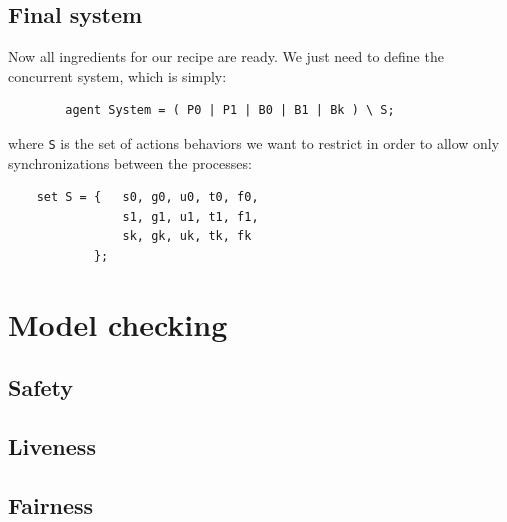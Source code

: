 \documentclass[10pt,a4paper]{article}
\newcommand{\CCSCode}[1]{{\tt #1}}
\begin{document}
    \subsection{Final system}

        Now all ingredients for our recipe are ready. We just need to
        define the concurrent system, which is simply:
        \begin{verbatim}
        agent System = ( P0 | P1 | B0 | B1 | Bk ) \ S;
        \end{verbatim}
        where \CCSCode{S} is the set of actions behaviors we want to
        restrict in order to allow only synchronizations between the
        processes:
        \begin{verbatim}
    set S = {   s0, g0, u0, t0, f0,
                s1, g1, u1, t1, f1,
                sk, gk, uk, tk, fk
            };
        \end{verbatim}

\section{Model checking}

    \subsection{Safety}

    \subsection{Liveness}

    \subsection{Fairness}
\end{document}
